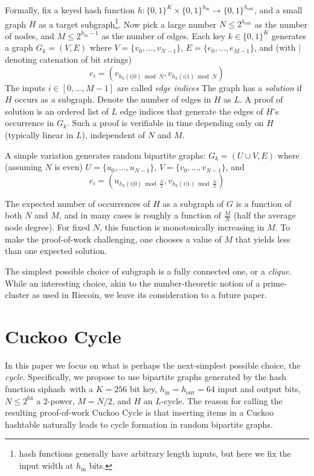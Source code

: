 \documentclass[11pt, oneside]{article}
\newcommand{\hash}{{\rm siphash}}
\newcommand{\hin}{h_{\mbox{in}}}
\newcommand{\hout}{h_{\mbox{out}}}
\begin{document}
Formally, fix a keyed hash function
$h: \{0,1\}^K \times \{0,1\}^{h_{\mbox{in}}} \rightarrow \{0,1\}^{h_{\mbox{out}}}$,
and a small graph $H$ as a target subgraph\footnote{hash functions generally have arbitrary length inputs,
but here we fix the input width at $\hin$ bits.}.
Now pick a large number $N \leq 2^{h_{\mbox{out}}}$ as the number of nodes,
and $M \leq 2^{\hin-1}$ as the number of edges.
Each key $k \in \{0,1\}^K$ generates a graph $G_k = (V,E)$ where $V=\{v_0,\ldots,v_{N-1}\}$,
$E=\{e_0,\ldots,e_{M-1}\}$, and (with $|$ denoting catenation of bit strings)
\begin{equation}
e_i=(v_{h_k(i|0) \bmod N},v_{h_k(i|1) \bmod N})
\end{equation}
The inputs $i \in [0,\ldots,M-1]$ are called {\em edge indices}
The graph has a {\em solution} if $H$ occurs as a subgraph.
Denote the number of edges in $H$ as $L$.
A proof of solution is an ordered list of $L$ edge indices that generate the edges
of $H$'s occurrence in $G_k$.
Such a proof is verifiable in time depending only on $H$ (typically linear in $L$), independent of $N$ and $M$.

A simple variation generates random bipartite graphs: $G_k = (U \cup V,E)$ where (assuming $N$ is even)
$U=\{u_0,\ldots,u_{N-1}\}$, $V=\{v_0,\ldots,v_{N-1}\}$, and
\begin{equation}
\label{hash_edges}
e_i=(u_{h_k(i|0) \bmod \frac{N}{2}}, v_{h_k(i|1) \bmod \frac{N}{2}})
\end{equation}

The expected number of occurrences of $H$ as a subgraph of $G$ is a function of both $N$ and $M$,
and in many cases is roughly a function of $\frac{M}{N}$ (half the average node degree).
For fixed $N$, this function is monotonically increasing in $M$.
To make the proof-of-work challenging, one chooses a value of $M$ that yields less than one
expected solution.

The simplest possible choice of subgraph is a fully connected one, or a {\em clique}.
While an interesting choice, akin to the number-theoretic notion of a prime-cluster
as used in Riecoin, we leave its consideration to a future paper.

\section{Cuckoo Cycle}
In this paper we focus on what is perhaps the next-simplest possible choice, the {\em cycle}.
Specifically, we propose to use bipartite graphs generated by the hash function \hash\ with a $K=256$ bit key,
$\hin = \hout = 64$ input and output bits, $N \leq 2^{64}$ a 2-power, $M=N/2$, and $H$ an $L$-cycle.
The reason for calling the resulting proof-of-work Cuckoo Cycle is that
inserting items in a Cuckoo hashtable naturally leads to cycle formation
in random bipartite graphs.
\end{document}
